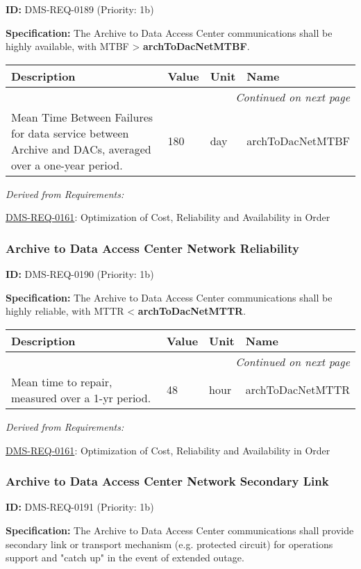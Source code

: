 \documentclass[SE,toc,lsstdraft]{lsstdoc}
\makeatletter
\newcommand{\paramname}[1]{\hspace{0pt}#1}
\newcommand{\unitname}[1]{\hspace{0pt}#1}
\newenvironment{parameters}[0]{%
\setlength\LTleft{0pt}
\setlength\LTright{\fill}
\begin{small}
\begin{longtable}[]{|p{0.49\textwidth}|l|p{0.6in}|p{1.70in}@{}|}

\hline \textbf{Description} & \textbf{Value} & \textbf{Unit} & \textbf{Name} \\ \hline
\endhead

\hline \multicolumn{4}{r}{\emph{Continued on next page}} \\
\endfoot

\hline\hline
\endlastfoot
}{%
\hline
\end{longtable}
\end{small}
}
\makeatother
\begin{document}
\label{DMS-REQ-0189}
\textbf{ID:} DMS-REQ-0189 (Priority: 1b)

\textbf{Specification:} The Archive to Data Access Center communications shall be highly available, with MTBF > \textbf{archToDacNetMTBF}.

\begin{parameters}
Mean Time Between Failures for data service between Archive and DACs, averaged over a one-year period.
&
180
&
\unitname{%
day
}
&
\paramname{%
archToDacNetMTBF
} \\\hline
\end{parameters}

\emph{Derived from Requirements:}

\hyperref[DMS-REQ-0161]{DMS-REQ-0161}:
Optimization of Cost, Reliability and Availability in Order \newline

\subsubsection{Archive to Data Access Center Network Reliability}

\label{DMS-REQ-0190}
\textbf{ID:} DMS-REQ-0190 (Priority: 1b)

\textbf{Specification:} The Archive to Data Access Center communications shall be highly reliable, with MTTR < \textbf{archToDacNetMTTR}.

\begin{parameters}
Mean time to repair, measured over a 1-yr period.
&
48
&
\unitname{%
hour
}
&
\paramname{%
archToDacNetMTTR
} \\\hline
\end{parameters}

\emph{Derived from Requirements:}

\hyperref[DMS-REQ-0161]{DMS-REQ-0161}:
Optimization of Cost, Reliability and Availability in Order \newline

\subsubsection{Archive to Data Access Center Network Secondary Link}

\label{DMS-REQ-0191}
\textbf{ID:} DMS-REQ-0191 (Priority: 1b)

\textbf{Specification: }The Archive to Data Access Center communications shall provide secondary link or transport mechanism (e.g. protected circuit) for operations support and "catch up" in the event of extended outage.
\end{document}
